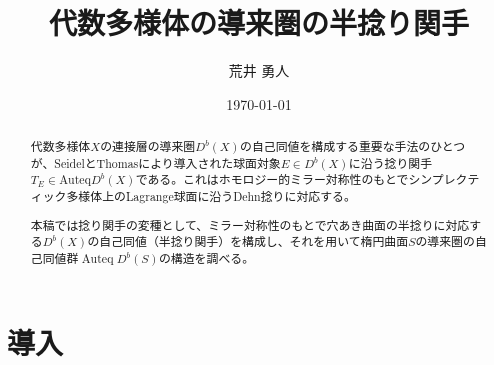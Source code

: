 \documentclass[uplatex,a4paper,dvipdfmx]{jsarticle}
\title{代数多様体の導来圏の半捻り関手}
\author{荒井 勇人}
\date{\today}
\theoremstyle{plain}
\theoremstyle{definition}
\DeclareMathOperator{\Auteq}{\mathrm{Auteq}}
\begin{document}
\maketitle

\begin{abstract}
	代数多様体$X$の連接層の導来圏$D^b(X)$の自己同値を構成する重要な手法のひとつが、SeidelとThomasにより導入された球面対象$E \in D^b(X)$に沿う捻り関手$T_E \in \mathrm{Auteq} D^b(X)$である。これはホモロジー的ミラー対称性のもとでシンプレクティック多様体上のLagrange球面に沿うDehn捻りに対応する。

	本稿では捻り関手の変種として、ミラー対称性のもとで穴あき曲面の半捻りに対応する$D^b(X)$の自己同値（半捻り関手）を構成し、それを用いて楕円曲面$S$の導来圏の自己同値群$\Auteq D^b(S)$の構造を調べる。
\end{abstract}

\section{導入}
\end{document}

